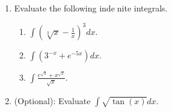 \documentclass[12pt]{article}
\begin{document}
\begin{enumerate}
\begin{enumerate}
    \end{enumerate}

\item Evaluate the following indenite integrals.
	\begin{enumerate}
	\item $\int (\sqrt[3]{x}-\frac{1}{x})^3 dx.$

	\item $\int (3^{-x}+e^{-5x})dx.$

	\item $\int \frac{e^{\sqrt{2}}+x^{\sqrt{2}}}{\sqrt{x}}.$
	\end{enumerate}

\item (Optional): Evaluate $\int \sqrt{\tan(x)}dx$.
\end{enumerate}
\end{document}
